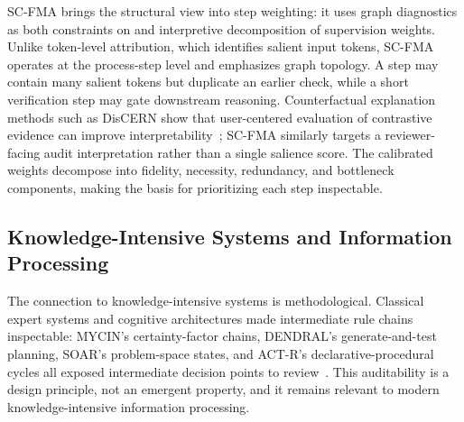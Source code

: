 \documentclass[a4paper,fleqn]{cas-sc}
\begin{document}
SC-FMA brings the structural view into step weighting: it uses graph diagnostics as both constraints on and interpretive decomposition of supervision weights. Unlike token-level attribution, which identifies salient input tokens, SC-FMA operates at the process-step level and emphasizes graph topology. A step may contain many salient tokens but duplicate an earlier check, while a short verification step may gate downstream reasoning. Counterfactual explanation methods such as DisCERN show that user-centered evaluation of contrastive evidence can improve interpretability~\cite{wijekoon2023counterfactual}; SC-FMA similarly targets a reviewer-facing audit interpretation rather than a single salience score. The calibrated weights decompose into fidelity, necessity, redundancy, and bottleneck components, making the basis for prioritizing each step inspectable.

\subsection{Knowledge-Intensive Systems and Information Processing}

The connection to knowledge-intensive systems is methodological. Classical expert systems and cognitive architectures made intermediate rule chains inspectable: MYCIN's certainty-factor chains, DENDRAL's generate-and-test planning, SOAR's problem-space states, and ACT-R's declarative-procedural cycles all exposed intermediate decision points to review~\cite{buchanan1984mycin,lindsay1980dendral,laird2012soar,anderson2004actr}. This auditability is a design principle, not an emergent property, and it remains relevant to modern knowledge-intensive information processing.
\end{document}
